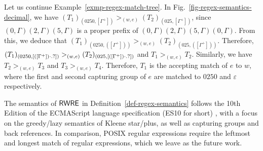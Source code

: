 \begin{example}\label{exmp-regex-semantics}
Let us continue Example~\ref{exmp-regex-match-tree}.  In Fig.~\ref{fig-regex-semantics-decimal}, we have $(T_1)_{(0250, [\Gamma^+])} >_{(w, e)} (T_2)_{(025, [\Gamma^+])}$, since $(0, \Gamma)(2, \Gamma)(5,\Gamma)$ is a proper prefix of $(0, \Gamma)(2, \Gamma)(5,\Gamma)(0, \Gamma)$. From this, we deduce that $(T_1)_{(0250, ([\Gamma^+]))} >_{(w, e)} (T_2)_{(025, ([\Gamma^+]))}$. Therefore, $(T_1)_{(0250, [([\Gamma^+]) \cdot .?])} >_{(w, e)} (T_2)_{(025,  [([\Gamma^+]) \cdot .?])}$ and $T_1 >_{(w,e)} T_2$. Similarly, we have $T_2 >_{(w,e)} T_3$ and $T_3 >_{(w,e)} T_4$. Therefore, $T_1$ is the accepting match of $e$ to $w$, where the first and second capturing group of $e$ are matched to $0250$  and $\varepsilon$ respectively. 
 \end{example}
  
\begin{remark}
The semantics of ${\sf RWRE}$ in Definition~\ref{def-regex-semantics} follows the 10th Edition of the ECMAScript language specification (ES10 for short) \cite{ECMAScript10}, with a focus on the greedy/lazy semantics of Kleene star/plus, as well as capturing groups and back references.
In comparison, POSIX regular expressions require the leftmost and longest match of regular expressions, which we leave as the future work. 
\end{remark}
  
  
  
%  
